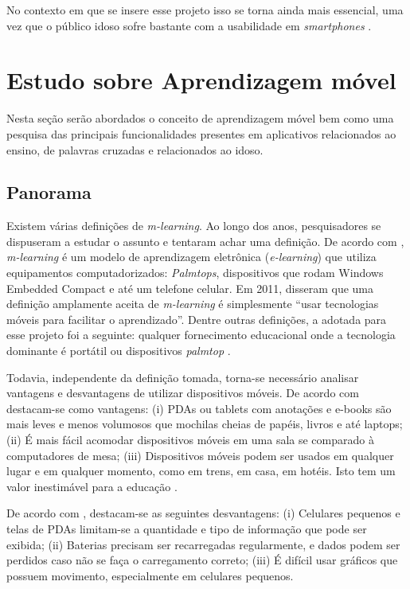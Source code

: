No contexto em que se insere esse projeto isso se torna ainda mais essencial, uma vez que o público idoso sofre bastante com a usabilidade em \textit{smartphones} \citep{dificuldadesIdosos}.  

\section{Estudo sobre Aprendizagem móvel}\label{sec:estudos_ap_movel} 
Nesta seção serão abordados o conceito de aprendizagem móvel bem como uma pesquisa das principais funcionalidades presentes em aplicativos relacionados ao ensino, de palavras cruzadas e relacionados ao idoso.

\subsection{Panorama}
Existem várias definições de \textit{m-learning}. Ao longo dos anos, pesquisadores se dispuseram a estudar o assunto e tentaram achar uma definição. De acordo com \cite{Quinn2000}, \textit{m-learning} é um modelo de aprendizagem eletrônica (\textit{e-learning}) que utiliza equipamentos computadorizados: \textit{Palmtops}, dispositivos que rodam Windows Embedded Compact e até um telefone celular.
Em 2011, \cite{hwang2011research} disseram que uma definição amplamente aceita de \textit{m-learning} é simplesmente ``usar tecnologias móveis para facilitar o aprendizado''. Dentre outras definições, a adotada para esse projeto foi a seguinte: qualquer fornecimento educacional onde a tecnologia dominante é portátil ou dispositivos \textit{palmtop} \citep{traxler2005defining}.

Todavia, independente da definição tomada, torna-se necessário analisar vantagens e desvantagens de utilizar dispositivos móveis. De acordo com \cite{RICHAMEHTA2016} destacam-se como vantagens: (i) PDAs ou tablets com anotações e e-books são mais leves e menos volumosos que mochilas cheias de papéis, livros e até laptops; (ii) É mais fácil acomodar dispositivos móveis em uma sala se comparado à computadores de mesa; (iii) Dispositivos móveis podem ser usados em qualquer lugar e em qualquer momento, como em trens, em casa, em hotéis. Isto tem um valor inestimável para a educação \citep{CarmaMaia2008}.

De acordo com \cite{RICHAMEHTA2016}, destacam-se as seguintes desvantagens: (i) Celulares pequenos e telas de PDAs limitam-se a quantidade e tipo de informação que pode ser exibida; (ii) Baterias precisam ser recarregadas regularmente, e dados podem ser perdidos caso não se faça o carregamento correto; (iii) É difícil usar gráficos que possuem movimento, especialmente em celulares pequenos.

